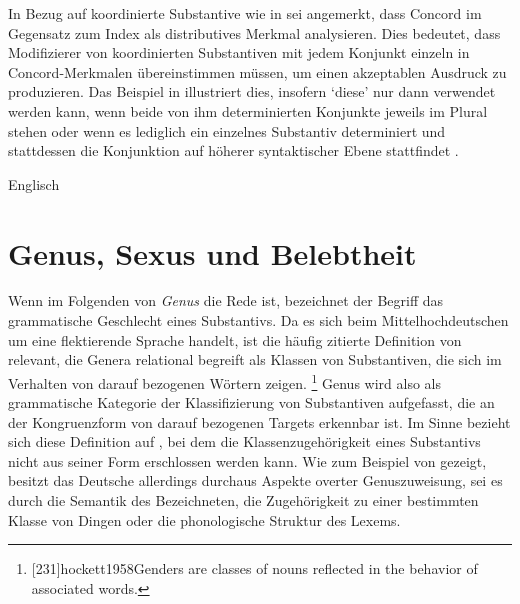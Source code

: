 In Bezug auf koordinierte Substantive wie in  sei angemerkt,
dass \citet[76--78]{kingdalrymple2004} Concord im Gegensatz zum Index als
distributives Merkmal analysieren. Dies bedeutet, dass Modifizierer von
koordinierten Substantiven mit jedem Konjunkt einzeln in Concord-Merkmalen
übereinstimmen müssen, um einen akzeptablen Ausdruck zu produzieren. Das
Beispiel in  illustriert dies, insofern 
`diese' nur dann verwendet werden kann, wenn beide von ihm determinierten
Konjunkte jeweils im Plural stehen  oder wenn es
lediglich ein einzelnes Substantiv determiniert und stattdessen die Konjunktion
auf höherer syntaktischer Ebene stattfindet
.

\begin{exe}
\ex\label{ex:engartdiscong}
	\langinfo%
		{Englisch}
		{}
		{\cite[nach][70]{kingdalrymple2004}}
	\begin{xlist}
		\label{ex:engartdiscong_1}
		\label{ex:engartdiscong_2}
		\label{ex:engartdiscong_3}
		\label{ex:engartdiscong_4}
	\end{xlist}
\end{exe}

\section{Genus, Sexus und Belebtheit}
\label{sec:gendsex}

Wenn im Folgenden von \textit{Genus} die Rede ist, bezeichnet der Begriff das
grammatische Geschlecht eines Substantivs. Da es sich beim
Mittelhochdeutschen um eine flektierende Sprache handelt,
ist die häufig zitierte Definition von \citet[231]{hockett1958} relevant, die
Genera relational begreift als Klassen von Substantiven, die sich im Verhalten
von darauf bezogenen Wörtern zeigen.%
%
	\footnote{[231]{hockett1958}{Genders are classes
		of nouns reflected in the behavior of associated words}.}
%
Genus wird also als grammatische Kategorie der Klassifizierung von Substantiven
aufgefasst, die an der Kongruenzform von darauf bezogenen Targets erkennbar
ist. Im Sinne  bezieht sich diese Definition auf
, bei dem die Klassenzugehörigkeit eines Substantivs nicht
aus seiner Form erschlossen werden kann. Wie zum Beispiel von
\citet{koepckezubin2017} gezeigt, besitzt das Deutsche
allerdings durchaus Aspekte overter Genuszuweisung, sei es durch die Semantik
des Bezeichneten, die Zugehörigkeit zu einer bestimmten Klasse von Dingen oder
die phonologische Struktur des Lexems.

